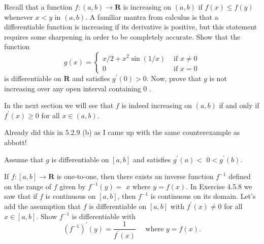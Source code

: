 \begin{exercise}
  Recall that a function $f:(a, b) \rightarrow \mathbf{R}$ is increasing on $(a, b)$ if $f(x) \leq f(y)$ whenever $x<y$ in $(a, b)$. A familiar mantra from calculus is that a differentiable function is increasing if its derivative is positive, but this statement requires some sharpening in order to be completely accurate.
  Show that the function
  $$
  g(x)= \begin{cases}x / 2+x^{2} \sin (1 / x) & \text { if } x \neq 0 \\ 0 & \text { if } x=0\end{cases}
  $$
  is differentiable on $\mathbf{R}$ and satisfies $g^{\prime}(0)>0$. Now, prove that $g$ is not increasing over any open interval containing 0 .

  In the next section we will see that $f$ is indeed increasing on $(a, b)$ if and only if $f^{\prime}(x) \geq 0$ for all $x \in(a, b)$.
\end{exercise}
\begin{solution}
  Already did this in 5.2.9 (b) as I came up with the same counterexample as abbott!
\end{solution}

\begin{exercise}
  Assume that $g$ is differentiable on $[a, b]$ and satisfies $g^{\prime}(a)<$ $0<g^{\prime}(b)$.
\end{exercise}
\begin{solution}
  \TODO
\end{solution}

\begin{exercise}
  If $f:[a, b] \rightarrow \mathbf{R}$ is one-to-one, then there exists an inverse function $f^{-1}$ defined on the range of $f$ given by $f^{-1}(y)=$ $x$ where $y=f(x)$. In Exercise 4.5.8 we saw that if $f$ is continuous on $[a, b]$, then $f^{-1}$ is continuous on its domain. Let's add the assumption that $f$ is differentiable on $[a, b]$ with $f^{\prime}(x) \neq 0$ for all $x \in[a, b]$. Show $f^{-1}$ is differentiable with
  $$
  \left(f^{-1}\right)^{\prime}(y)=\frac{1}{f^{\prime}(x)} \quad \text { where } y=f(x) .
  $$
\end{exercise}
\begin{solution}
  \TODO
\end{solution}
